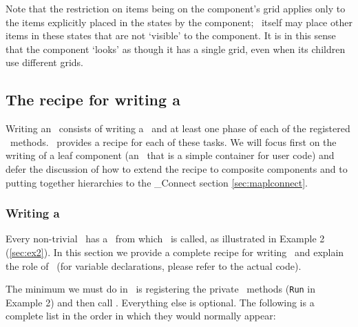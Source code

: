 Note that the restriction on items being on the component's grid applies only
to the items explicitly placed in the states by the component; \ggn\ itself 
may place other items in these states that are not `visible' to
the component. It is in this sense that the component
`looks' as though it has a single grid, even when its children use 
different grids.




\subsection{The recipe for writing a \ggc}

Writing an \egc\ consists of writing a \ssv\ and at least one 
phase of each of the registered \IRF\ methods. \ggn\ provides
a recipe for each of these tasks. We will focus first on the
writing of a leaf component (an \egc\ that is a simple container for
user code) and defer the discussion of how to
extend the recipe to composite components and to putting together
hierarchies to the \ggn \_Connect section \ref{sec:maplconnect}. 

\subsubsection{Writing a \ssv}
\label{sec:wrtSetServices}

Every non-trivial \ggc\  has a \ssv\  from which \gssv\  is called, 
as illustrated in Example 2 (\ref{sec:ex2}). In this section we provide
a complete recipe for writing \ssv\ and explain the role of \gssv\ (for
variable declarations, please refer to the actual code).

The minimum we must do in \ssv\ is registering the private \IRF\ methods
(\texttt{Run} in Example 2) and then call \gssv. Everything
else is optional. The following is a complete list
in the order in which they would normally appear:

